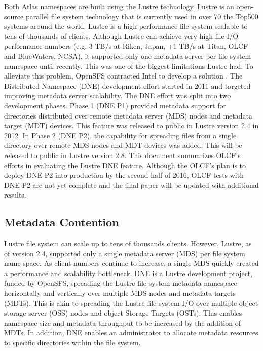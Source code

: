 \documentclass[conference,compsoc]{IEEEtran}
\begin{document}
Both Atlas namespaces are built using the Lustre technology. Lustre is an
open-source parallel file system technology that is currently used in over 70%
the Top500 systems around the world. Lustre is a high-performance file system
scalable to tens of thousands of clients. Although Lustre can achieve very high
file I/O performance numbers (e.g. 3 TB/s at Riken, Japan, +1 TB/s at Titan,
OLCF and BlueWaters, NCSA), it supported only one metadata server per file
system namespace until recently. This was one of the biggest limitations Lustre
had. To alleviate this problem, OpenSFS contracted Intel to develop a solution
\cite{dne-contract}.  The Distributed Namespace (DNE) development effort
started in 2011 and targeted improving metadata server scalability.  The
DNE effort was split into two development phases.  Phase 1 (DNE P1) provided
metadata support for directories distributed over remote metadata server (MDS)
nodes and metadata target (MDT) devices. This feature was released to public in
Lustre version 2.4 in 2012. In Phase 2 (DNE P2), the capability for spreading files
from a single directory over remote MDS nodes and MDT devices was added. This
will be released to public in Lustre version 2.8.  This document summarizes
OLCF's efforts in evaluating the Lustre DNE feature. Although the OLCF's plan is to deploy
DNE P2 into production by the second half of 2016, OLCF tests with DNE
P2 are not yet complete and the final paper will be updated with additional results.

\subsection{Metadata Contention}

Lustre file system can scale up to tens of thousands clients. However, Lustre,
as of version 2.4, supported only a single metadata server (MDS) per file
system name space. As client numbers continue to increase, a single MDS quickly
created a performance and scalability bottleneck. DNE is a Lustre development
project, funded by OpenSFS, spreading the Lustre file system metadata namespace
horizontally and vertically over multiple MDS nodes and metadata targets
(MDTs). This is akin to spreading the Lustre file system I/O over multiple
object storage server (OSS) nodes and object Storage Targets (OSTs). This
enables namespace size and metadata throughput to be increased by the addition
of MDTs. In addition, DNE enables an administrator to allocate metadata
resources to specific directories within the file system. 
\end{document}
